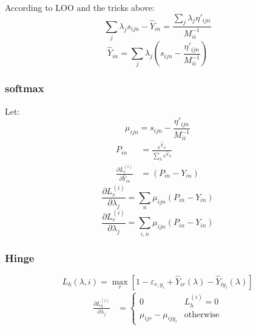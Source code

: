 According to LOO and the tricks above:
\[\sum_j\lambda_js_{ijn}-\hat{Y}_{in} = \frac{\sum_j\lambda_j{\eta}'_{ijn}}{M_{ii}^{-1}}\]
\[\hat{Y}_{in} = \sum_j\lambda_j\left(s_{ijn}-\frac{{\eta}'_{ijn}}{M_{ii}^{-1}}\right)\]
\subsubsection{softmax}
Let:
\[\mu_{ijn}=s_{ijn}-\frac{{\eta}'_{ijn}}{M_{ii}^{-1}}\]
\begin{equation}
\begin{aligned}
P_{in} &= \frac{e^{\hat{Y}_{in}}}{\sum_{h} e^{\hat{Y}_{ih}}}\\
\frac{\partial L_c^{(i)}}{\partial \hat{Y}_{in}}&=\left(P_{in}-{Y}_{in}\right)
\end{aligned}
\end{equation}
\[\frac{\partial L_c^{(i)}}{\partial \lambda_j}=\sum_{n}\mu_{ijn}\left(P_{in}-Y_{in}\right)\]
\[\frac{\partial L_c^{(i)}}{\partial \lambda_j}=\sum_{i,n}\mu_{ijn}\left(P_{in}-Y_{in}\right)\]
\subsubsection{Hinge}
\begin{equation}
L_{h}\left( {\lambda ,i} \right) = \mathop {\max }\limits_r {\left[ {1 - {\varepsilon _{r,{y_i}}} + {{\hat Y}_{ir}}\left( {\lambda } \right) - {{\hat Y}_{i{y_i}}}\left( {\lambda } \right)} \right]}
\end{equation}
\begin{equation}
\begin{aligned}
\frac{\partial L_h^{(i)}}{\partial \lambda_j}&= 
\begin{cases}
0 & L_h^{(i)}=0\\
\mu_{ijr}-\mu_{ijy_i}& \text{otherwise}
\end{cases}\\
\end{aligned}
\end{equation}